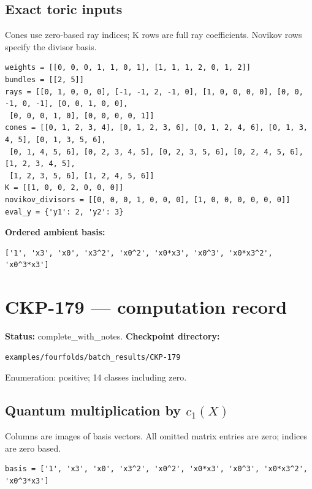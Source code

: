 \documentclass[10pt,a4paper]{article}
\begin{document}
\subsection*{Exact toric inputs}
Cones use zero-based ray indices; K rows are full ray coefficients. Novikov rows specify the divisor basis.

\begin{lstlisting}
weights = [[0, 0, 0, 1, 1, 0, 1], [1, 1, 1, 2, 0, 1, 2]]
bundles = [[2, 5]]
rays = [[0, 1, 0, 0, 0], [-1, -1, 2, -1, 0], [1, 0, 0, 0, 0], [0, 0, -1, 0, -1], [0, 0, 1, 0, 0],
 [0, 0, 0, 1, 0], [0, 0, 0, 0, 1]]
cones = [[0, 1, 2, 3, 4], [0, 1, 2, 3, 6], [0, 1, 2, 4, 6], [0, 1, 3, 4, 5], [0, 1, 3, 5, 6],
 [0, 1, 4, 5, 6], [0, 2, 3, 4, 5], [0, 2, 3, 5, 6], [0, 2, 4, 5, 6], [1, 2, 3, 4, 5],
 [1, 2, 3, 5, 6], [1, 2, 4, 5, 6]]
K = [[1, 0, 0, 2, 0, 0, 0]]
novikov_divisors = [[0, 0, 0, 1, 0, 0, 0], [1, 0, 0, 0, 0, 0, 0]]
eval_y = {'y1': 2, 'y2': 3}
\end{lstlisting}

\textbf{Ordered ambient basis:}
\begin{lstlisting}
['1', 'x3', 'x0', 'x3^2', 'x0^2', 'x0*x3', 'x0^3', 'x0*x3^2', 'x0^3*x3']
\end{lstlisting}

\clearpage\section*{CKP-179 --- computation record}
\textbf{Status:} complete\_with\_notes.
\textbf{Checkpoint directory:}
\begin{lstlisting}
examples/fourfolds/batch_results/CKP-179
\end{lstlisting}

Enumeration: positive; 14 classes including zero.
\subsection*{Quantum multiplication by $c_1(X)$}
Columns are images of basis vectors. All omitted matrix entries are zero; indices are zero based.

\begin{lstlisting}
basis = ['1', 'x3', 'x0', 'x3^2', 'x0^2', 'x0*x3', 'x0^3', 'x0*x3^2', 'x0^3*x3']
\end{lstlisting}
\end{document}
